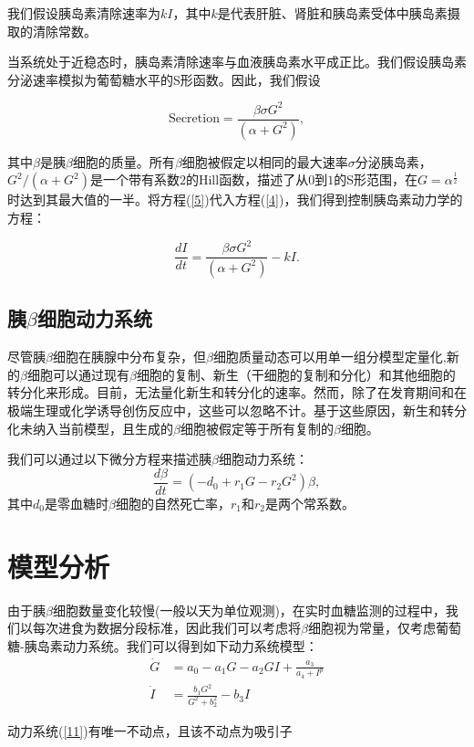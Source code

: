我们假设胰岛素清除速率为\(kI\)，其中$k$是代表肝脏、肾脏和胰岛素受体中胰岛素摄取的清除常数。

当系统处于近稳态时，胰岛素清除速率与血液胰岛素水平成正比。我们假设胰岛素分泌速率模拟为葡萄糖水平的S形函数\cite{topp2000model}。因此，我们假设

\begin{equation}\label{5}
\text{Secretion} = \frac{\beta\sigma G^2}{(\alpha + G^2)},
\end{equation}

其中$\beta$是胰$\beta$细胞的质量。所有$\beta$细胞被假定以相同的最大速率$\sigma$分泌胰岛素，\(G^2/(\alpha + G^2)\)是一个带有系数$2$的Hill函数，描述了从$0$到$1$的S形范围，在$G=\alpha^{\frac{1}{2}}$时达到其最大值的一半。将方程(\ref{5})代入方程(\ref{4})，我们得到控制胰岛素动力学的方程：

\begin{equation}
    \frac{dI}{dt} = \frac{\beta\sigma G^2}{(\alpha + G^2)} - kI.
\end{equation}

\subsection{胰\(\beta\)细胞动力系统}
尽管胰$\beta$细胞在胰腺中分布复杂，但$\beta$细胞质量动态可以用单一组分模型定量化,新的$\beta$细胞可以通过现有$\beta$细胞的复制、新生（干细胞的复制和分化）和其他细胞的转分化来形成。目前，无法量化新生和转分化的速率。然而，除了在发育期间和在极端生理或化学诱导创伤反应中，这些可以忽略不计\cite{finegood1995dynamics}。基于这些原因，新生和转分化未纳入当前模型，且生成的$\beta$细胞被假定等于所有复制的$\beta$细胞。

我们可以通过以下微分方程来描述胰$\beta$细胞动力系统：
\begin{equation}
    \frac{d\beta}{dt} = (-d_0+r_1G-r_2G^2)\beta,
\end{equation}
其中$d_0$是零血糖时$\beta$细胞的自然死亡率，$r_1$和$r_2$是两个常系数\cite{topp2000model}。
\section{模型分析}

由于胰$\beta$细胞数量变化较慢(一般以天为单位观测)，在实时血糖监测的过程中，我们以每次进食为数据分段标准，因此我们可以考虑将$\beta$细胞视为常量，仅考虑葡萄糖-胰岛素动力系统\cite{huard2022mathematical}。我们可以得到如下动力系统模型：
\begin{equation}\label{11}
    \begin{aligned}
        \dot{G} &= a_0-a_1G-a_2GI+\frac{a_3}{a_4+I^p} \\
        \dot{I} &= \frac{b_1 G^2}{G^2 + b_2^2} - b_3 I
    \end{aligned}
\end{equation}
\begin{prop}
    动力系统(\ref{11})有唯一不动点，且该不动点为吸引子
\end{prop}

